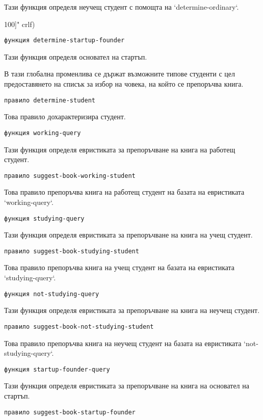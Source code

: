 \documentclass[a4paper]{article}
\begin{document}
Тази функция определя неучещ студент с помощта на `determine-ordinary`.

100]" crlf)
\begin{verbatim}функция determine-startup-founder\end{verbatim}

Тази функция определя основател на стартъп.

В тази глобална променлива се държат възможните типове студенти с цел
предоставянето на списък за избор на човека, на който се препоръчва книга.
\begin{verbatim}правило determine-student\end{verbatim}

Това правило дохарактеризира студент.
\begin{verbatim}функция working-query\end{verbatim}

Тази функция определя евристиката за препоръчване на книга 
на работещ студент.
\begin{verbatim}правило suggest-book-working-student\end{verbatim}

Това правило препоръчва книга на работещ студент на базата на евристиката
`working-query`.
\begin{verbatim}функция studying-query\end{verbatim}

Тази функция определя евристиката за препоръчване на книга на
учещ студент.
\begin{verbatim}правило suggest-book-studying-student\end{verbatim}

Това правило препоръчва книга на учещ студент на базата на евристиката
`studying-query`.
\begin{verbatim}функция not-studying-query\end{verbatim}

Тази функция определя евристиката за препоръчване на книга на
неучещ студент.
\begin{verbatim}правило suggest-book-not-studying-student\end{verbatim}

Това правило препоръчва книга на неучещ студент на базата на евристиката
`not-studying-query`.
\begin{verbatim}функция startup-founder-query\end{verbatim}

Тази функция определя евристиката за препоръчване на книга на
основател на стартъп.
\begin{verbatim}правило suggest-book-startup-founder\end{verbatim}
\end{document}
